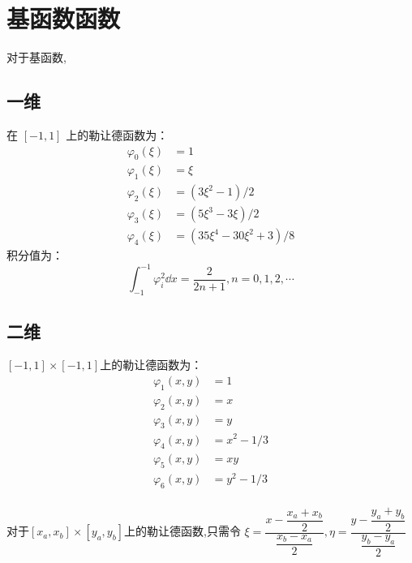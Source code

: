 \documentclass{book}
\begin{document}
\begin{example}
\begin{example}{}{}
\begin{example}
\begin{example}
\begin{example}
\begin{example}
\begin{example}{}{}
\begin{example}
\begin{example}{}{}
\end{example}


\newpage
\section{基函数函数}
对于基函数,
\cite{RN48}
\subsection{一维}
在 $[-1,1]$ 上的勒让德函数为：
\begin{equation}
    \begin{aligned}
        \varphi_{0}(\xi) & =1                                        \\
        \varphi_{1}(\xi) & =\xi                                      \\
        \varphi_{2}(\xi) & =\left(3 \xi^{2}-1\right) / 2             \\
        \varphi_{3}(\xi) & =\left(5 \xi^{3}-3 \xi\right) / 2         \\
        \varphi_{4}(\xi) & =\left(35 \xi^{4}-30 \xi^{2}+3\right) / 8
    \end{aligned}
\end{equation}
积分值为：
\begin{equation}
    \int_{-1}^{-1}\varphi_i^2\dd x=\frac{2}{2n+1},n=0,1,2,\cdots
\end{equation}

\subsection{二维}
$[-1,1]\times[-1,1]$上的勒让德函数为：
\begin{equation}
    \begin{aligned}
        \varphi_{1}(x,y) & = 1       \\
        \varphi_{2}(x,y) & = x       \\
        \varphi_{3}(x,y) & = y       \\
        \varphi_{4}(x,y) & = x^2-1/3 \\
        \varphi_{5}(x,y) & = xy      \\
        \varphi_{6}(x,y) & = y^2-1/3 \\
    \end{aligned}
\end{equation}

对于$[x_a,x_b]\times[y_a,y_b]$上的勒让德函数,只需令 $\xi=\dfrac{x - \dfrac{x_a+x_b}{2}}{\dfrac{x_b-x_a}{2}},\eta = \dfrac{y - \dfrac{y_a+y_b}{2}}{\dfrac{y_b-y_a}{2}}$

\end{example}
\end{example}
\end{example}
\end{example}
\end{example}
\end{example}
\end{example}
\end{example}
\end{document}
